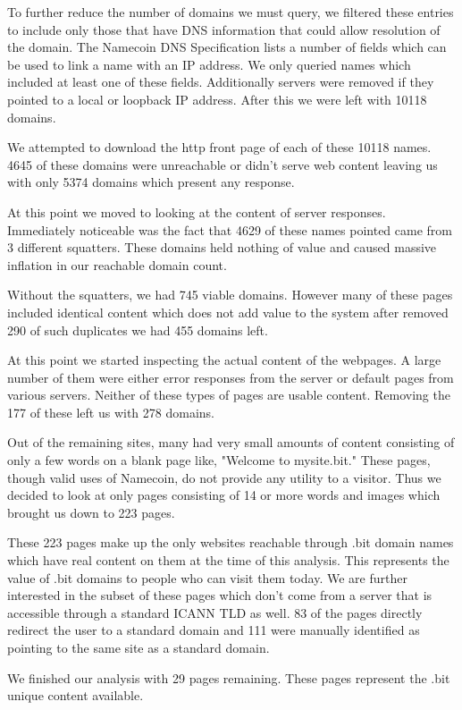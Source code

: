 To further reduce the number of domains we must query, we filtered these entries to include only those that have DNS information that could allow resolution of the domain. The Namecoin DNS Specification lists a number of fields which can be used to link a name with an IP address. We only queried names which included at least one of these fields. Additionally servers were removed if they pointed to a local or loopback IP address. After this we were left with 10118 domains.

We attempted to download the http front page of each of these 10118 names. 4645 of these domains were unreachable or didn't serve web content leaving us with only 5374 domains which present any response.

At this point we moved to looking at the content of server responses. Immediately noticeable was the fact that 4629 of these names pointed came from 3 different squatters. These domains held nothing of value and caused massive inflation in our reachable domain count.

Without the squatters, we had 745 viable domains. However many of these pages included identical content which does not add value to the system after removed 290 of such duplicates we had 455 domains left.

At this point we started inspecting the actual content of the webpages. A large number of them were either error responses from the server or default pages from various servers. Neither of these types of pages are usable content. Removing the 177 of these left us with 278 domains.

Out of the remaining sites, many had very small amounts of content consisting of only a few words on a blank page like, "Welcome to mysite.bit." These pages, though valid uses of Namecoin, do not provide any utility to a visitor. Thus we decided to look at only pages consisting of 14 or more words and images which brought us down to 223 pages.

These 223 pages make up the only websites reachable through .bit domain names which have real content on them at the time of this analysis. This represents the value of .bit domains to people who can visit them today. We are further interested in the subset of these pages which don't come from a server that is accessible through a standard ICANN TLD as well.  83 of the pages directly redirect the user to a standard domain and 111 were manually identified as pointing to the same site as a standard domain.

We finished our analysis with 29 pages remaining. These pages represent the .bit unique content available.
